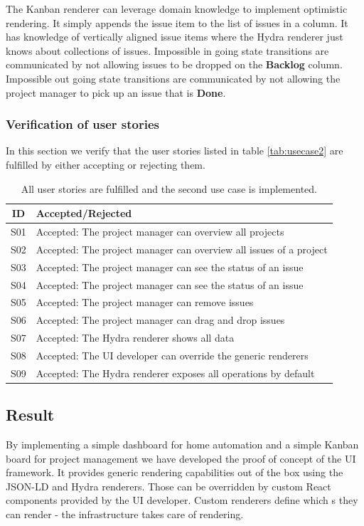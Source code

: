The Kanban renderer can leverage domain knowledge to implement optimistic rendering. It simply appends the issue item to the list of issues in a column. It has knowledge of vertically aligned issue items where the Hydra renderer just knows about collections of issues. Impossible in going state transitions are communicated by not allowing issues to be dropped on the \textbf{Backlog} column. Impossible out going state transitions are communicated by not allowing the project manager to pick up an issue that is \textbf{Done}.

\subsubsection{Verification of user stories}
In this section we verify that the user stories listed in table \ref{tab:usecase2} are fulfilled by either accepting or rejecting them.

\begin{table}
  \begin{center}
    \begin{tabular}{ |c|l| }
      \hline
      ID & Accepted/Rejected \\
      \hline
      S01 & Accepted: The project manager can overview all projects \\
      S02 & Accepted: The project manager can overview all issues of a project \\
      S03 & Accepted: The project manager can see the status of an issue \\
      S04 & Accepted: The project manager can see the status of an issue \\
      S05 & Accepted: The project manager can remove issues \\
      S06 & Accepted: The project manager can drag and drop issues \\
      S07 & Accepted: The Hydra renderer shows all data \\
      S08 & Accepted: The UI developer can override the generic renderers \\
      S09 & Accepted: The Hydra renderer exposes all operations by default \\
      \hline
    \end{tabular}
    \caption{All user stories are fulfilled and the second use case is implemented.}
  \end{center}
\end{table}

\subsection{Result}
By implementing a simple dashboard for home automation and a simple Kanban board for project management we have developed the proof of concept of the UI framework. It provides generic rendering capabilities out of the box using the JSON-LD and Hydra renderers. Those can be overridden by custom React components provided by the UI developer. Custom renderers define which s they can render - the infrastructure takes care of rendering.

